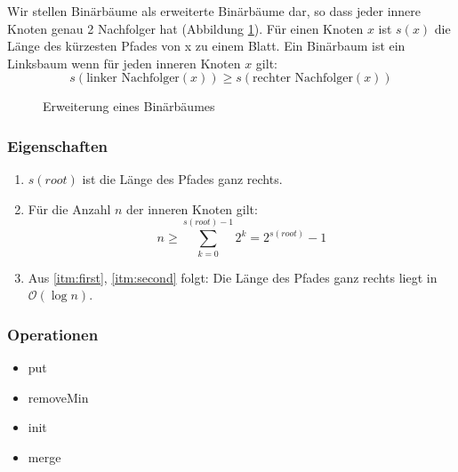 Wir stellen Binär\-bäume als erweiterte Binär\-bäume dar, so dass jeder innere Knoten genau 2 Nachfolger hat  (Abbildung \ref{fig:BinaerBaumExtendet}).
Für einen Knoten \(x\) ist \(s(x)\) die Länge des kürzesten Pfades von x zu einem Blatt.
Ein Binärbaum ist ein Linksbaum wenn für jeden inneren Knoten \(x\) gilt:
\[s(\textrm{linker Nachfolger}(x)) \geq s(\textrm{rechter Nachfolger}(x)) \]
\begin{figure}[htbp]
	\begin{center}
		\hspace{1cm}
	\end{center}
	\caption{Erweiterung eines Binärbäumes}
	\label{fig:BinaerBaumExtendet}
\end{figure}

\newpage
\subsubsection{Eigenschaften}
\begin{enumerate}
	\item \label{itm:first} \(s(root)\) ist die Länge des Pfades ganz rechts.
	\item \label{itm:second} Für die Anzahl \(n\) der inneren Knoten  gilt:
		\[ n\geq \sum \limits_{k=0}^{s(root)-1} 2^{k} = 2^{s(root)}-1\]
	\item Aus \ref{itm:first}, \ref{itm:second} folgt: Die Länge des Pfades ganz rechts liegt in \(\mathcal{O}(\log n)\).
\end{enumerate}

\subsubsection{Operationen}
\begin{itemize}
	\item put
	\item removeMin
	\item init
	\item merge
\end{itemize}

